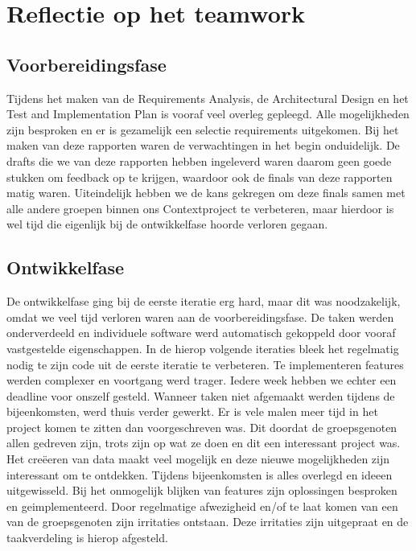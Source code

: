 \documentclass[a4paper,10pt]{article}
\begin{document}
\section{Reflectie op het teamwork}

	\subsection{Voorbereidingsfase}
	Tijdens het maken van de Requirements Analysis, de Architectural Design en het Test and Implementation Plan is vooraf veel overleg gepleegd. Alle mogelijkheden zijn besproken en er is gezamelijk een selectie requirements uitgekomen. Bij het maken van deze rapporten waren de verwachtingen in het begin onduidelijk. De drafts die we van deze rapporten hebben ingeleverd waren daarom geen goede stukken om feedback op te krijgen, waardoor ook de finals van deze rapporten matig waren. Uiteindelijk hebben we de kans gekregen om deze finals samen met alle andere groepen binnen ons Contextproject te verbeteren, maar hierdoor is wel tijd die eigenlijk bij de ontwikkelfase hoorde verloren gegaan.
	
	\subsection{Ontwikkelfase}
	De ontwikkelfase ging bij de eerste iteratie erg hard, maar dit was noodzakelijk, omdat we veel tijd verloren waren aan de voorbereidingsfase. De taken werden onderverdeeld en individuele software werd automatisch gekoppeld door vooraf vastgestelde eigenschappen. In de hierop volgende iteraties bleek het regelmatig nodig te zijn code uit de eerste iteratie te verbeteren. Te implementeren features werden complexer en voortgang werd trager. Iedere week hebben we echter een deadline voor onszelf gesteld. Wanneer taken niet afgemaakt werden tijdens de bijeenkomsten, werd thuis verder gewerkt. Er is vele malen meer tijd in het project komen te zitten dan voorgeschreven was. Dit doordat de groepsgenoten allen gedreven zijn, trots zijn op wat ze doen en dit een interessant project was. Het cre\"eeren van data maakt veel mogelijk en deze nieuwe mogelijkheden zijn interessant om te ontdekken. Tijdens bijeenkomsten is alles overlegd en ideeen uitgewisseld. Bij het onmogelijk blijken van features zijn oplossingen besproken en geimplementeerd. Door regelmatige afwezigheid en/of te laat komen van een van de groepsgenoten zijn irritaties ontstaan. Deze irritaties zijn uitgepraat en de taakverdeling is hierop afgesteld. 
	
\end{document}
